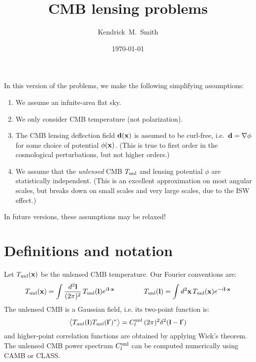 \documentclass[aps,prd,superscriptaddress,groupedaddress,nofootinbib,nobibnotes]{revtex4}
\newcommand{\be}{\begin{equation}}
\newcommand{\ee}{\end{equation}}
\def\x{{\bf x}}
\def\l{{\bf l}}
\begin{document}
\title{CMB lensing problems}

\author{Kendrick~M.~Smith}

\date{\today}


\maketitle

\par\noindent
In this version of the problems, we make the following simplifying assumptions:
\begin{enumerate}
\item We assume an infnite-area flat sky.
\item We only consider CMB temperature (not polarization).
\item The CMB lensing deflection field ${\bf d}(\x)$ is assumed to be curl-free,
  i.e.~${\bf d} = \nabla \phi$ for some choice of potential
  $\phi(\x)$.  (This is true to first order in the cosmological perturbations,
  but not higher orders.)
\item We assume that the {\em unlensed} CMB $T_{\rm unl}$ and lensing potential $\phi$
  are statistically independent.  (This is an excellent approximation on most angular scales,
  but breaks down on small scales and very large scales, due to the ISW effect.)
\end{enumerate}
In future versions, these assumptions may be relaxed!

\section{Definitions and notation}

Let $T_{\rm unl}(\x)$ be the unlensed CMB temperature.
Our Fourier conventions are:
\be
T_{\rm unl}(\x) = \int \frac{d^2\l}{(2\pi)^2} \, T_{\rm unl}(\l) e^{i\l\cdot\x}
\hspace{1.5cm}
T_{\rm unl}(\l) = \int d^2\x \, T_{\rm unl}(\x) e^{-i\l\cdot\x}  \label{eq:continuous_fourier_conventions}
\ee
The unlensed CMB is a Gaussian field, i.e. its two-point function is:
\be
\big\langle T_{\rm unl}(\l) T_{\rm unl}(\l')^* \big\rangle = C_l^{\rm unl} \, (2\pi)^2 \delta^2(\l-\l')  \label{eq:continuous_cl}
\ee
and higher-point correlation functions are obtained by applying Wick's theorem.
The unlensed CMB power spectrum $C_l^{\rm unl}$ can be computed numerically using
CAMB or CLASS.
\end{document}

